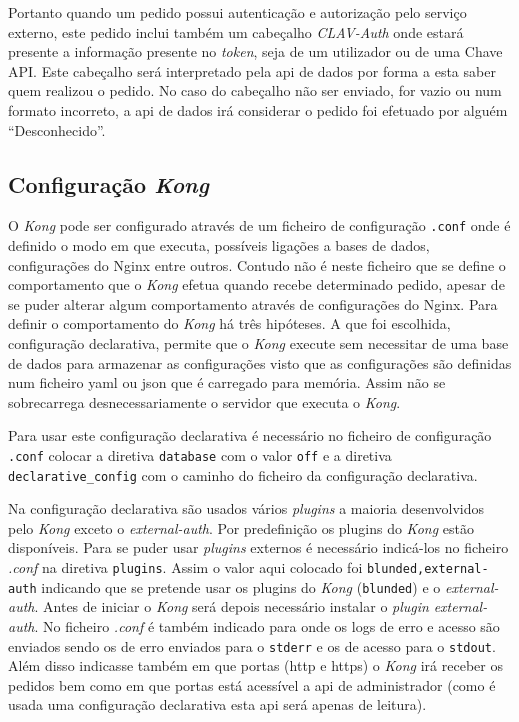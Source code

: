 Portanto quando um pedido possui autenticação e autorização pelo serviço externo, este pedido inclui também um cabeçalho \textit{CLAV-Auth} onde estará presente a informação presente no \textit{token}, seja de um utilizador ou de uma Chave API. Este cabeçalho será interpretado pela \acrshort{api} de dados por forma a esta saber quem realizou o pedido. No caso do cabeçalho não ser enviado, for vazio ou num formato incorreto, a \acrshort{api} de dados irá considerar o pedido foi efetuado por alguém ``Desconhecido''.

\subsection{Configuração \textit{Kong}}
O \textit{Kong} pode ser configurado através de um ficheiro de configuração \texttt{.conf} onde é definido o modo em que executa, possíveis ligações a bases de dados, configurações do Nginx entre outros. Contudo não é neste ficheiro que se define o comportamento que o \textit{Kong} efetua quando recebe determinado pedido, apesar de se puder alterar algum comportamento através de configurações do Nginx. Para definir o comportamento do \textit{Kong} há três hipóteses. A que foi escolhida, configuração declarativa, permite que o \textit{Kong} execute sem necessitar de uma base de dados para armazenar as configurações visto que as configurações são definidas num ficheiro \acrshort{yaml} ou \acrshort{json} que é carregado para memória. Assim não se sobrecarrega desnecessariamente o servidor que executa o \textit{Kong}.

Para usar este configuração declarativa é necessário no ficheiro de configuração \texttt{.conf} colocar a diretiva \texttt{database} com o valor \texttt{off} e a diretiva \texttt{declarative\_config} com o caminho do ficheiro da configuração declarativa.

Na configuração declarativa são usados vários \textit{plugins} a maioria desenvolvidos pelo \textit{Kong} exceto o \textit{external-auth}. Por predefinição os plugins do \textit{Kong} estão disponíveis. Para se puder usar \textit{plugins} externos é necessário indicá-los no ficheiro \textit{.conf} na diretiva \texttt{plugins}. Assim o valor aqui colocado foi \texttt{blunded,external-auth} indicando que se pretende usar os plugins do \textit{Kong} (\texttt{blunded}) e o \textit{external-auth}. Antes de iniciar o \textit{Kong} será depois necessário instalar o \textit{plugin} \textit{external-auth}. No ficheiro \textit{.conf} é também indicado para onde os logs de erro e acesso são enviados sendo os de erro enviados para o \texttt{stderr} e os de acesso para o \texttt{stdout}. Além disso indicasse também em que portas (\acrshort{http} e \acrshort{https}) o \textit{Kong} irá receber os pedidos bem como em que portas está acessível a \acrshort{api} de administrador (como é usada uma configuração declarativa esta \acrshort{api} será apenas de leitura).


